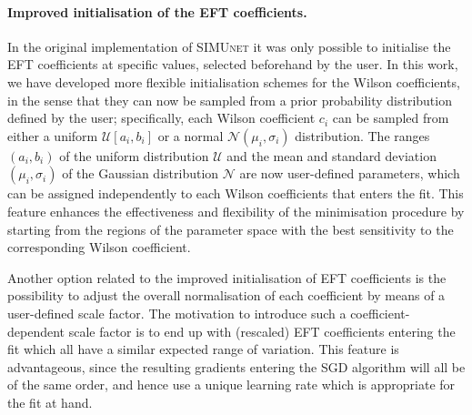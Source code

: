 \documentclass[withindex,glossary]{cam-thesis}
\newcommand{\simunet}{\textsc{SIMUnet}}
\begin{document}
\paragraph{Improved initialisation of the EFT coefficients.}
%
In the original implementation of \simunet{} it was only possible
to initialise the EFT coefficients at specific values, selected beforehand
by the user.
%
In this work, we have developed more flexible initialisation schemes for the Wilson
coefficients, in the sense that they can now be sampled from a prior probability
distribution defined by the user; specifically, each Wilson coefficient $c_i$ can be
sampled from either a uniform $\mathcal{U} [a_i, b_i]$ or a normal $\mathcal{N}(\mu_i,
\sigma_i)$ distribution.
%
The ranges  $(a_i, b_i)$  of the uniform distribution $\mathcal{U}$
and the mean and standard deviation $(\mu_i, \sigma_i)$ of the Gaussian
distribution $\mathcal{N}$ are now user-defined parameters, which can
be assigned independently to each Wilson coefficients that enters the fit.
%
This feature enhances the effectiveness and flexibility of the minimisation procedure by
starting from the regions of the parameter space with the best sensitivity
to the corresponding Wilson coefficient.

Another option related to the improved initialisation of EFT coefficients
is the possibility to adjust the overall normalisation of each coefficient
by means of a user-defined scale factor.
%
The motivation to introduce such a coefficient-dependent scale factor
is to end up with (rescaled) EFT coefficients entering the fit which all have
a similar expected range of variation.
%
This feature is advantageous, since the resulting gradients entering the SGD algorithm
will all be of the same order, and hence use a unique learning rate which is appropriate for the fit at hand.
%

\end{document}
